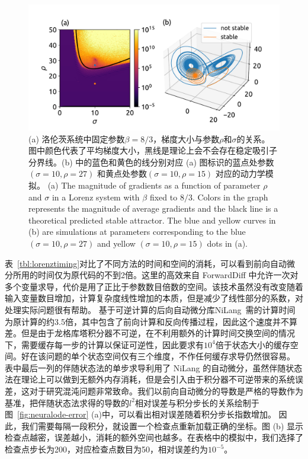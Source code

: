 \documentclass[A4,twoside,UTF8]{ctexart}
\begin{document}
\begin{figure}[t]
\centering
\includegraphics[width=0.8\columnwidth]{./fig4.pdf}
    \caption{(a) 洛伦茨系统中固定参数$\beta=8/3$，梯度大小与参数$\rho$和$\sigma$的关系。
    图中颜色代表了平均梯度大小，黑线是理论上会不会存在稳定吸引子分界线。(b) 中的蓝色和黄色的线分别对应 (a) 图标识的蓝点处参数 $(\sigma=10, \rho=27)$ 和黄点处参数$(\sigma=10, \rho=15)$ 对应的动力学模拟。
    (a) The magnitude of gradients as a function of parameter $\rho$ and $\sigma$ in a Lorenz system with  $\beta$ fixed to $8/3$.
    Colors in the graph represents the magnitude of average gradients and the black line is a theoretical predicted  stable attractor. The blue and yellow curves in (b) are simulations at parameters corresponding to the blue $(\sigma=10, \rho=27)$ and yellow $(\sigma=10, \rho=15)$ dots in (a).
    }\label{fig:chaos}
\end{figure}
表~\ref{tbl:lorenztiming}对比了不同方法的时间和空间的消耗，可以看到前向自动微分所用的时间仅为原代码的不到2倍。这里的高效来自 ForwardDiff 中允许一次对多个变量求导，代价是用了正比于参数数目倍数的空间。该技术虽然没有改变随着输入变量数目增加，计算复杂度线性增加的本质，但是减少了线性部分的系数，对处理实际问题很有帮助。
基于可逆计算的后向自动微分库NiLang~\cite{Liu2020b}需的计算时间为原计算的约3.5倍，其中包含了前向计算和反向传播过程，因此这个速度并不算差。但是由于龙格库塔积分器不可逆，在不利用额外的计算时间交换空间的情况下，需要缓存每一步的计算以保证可逆性，因此要求有$10^4$倍于状态大小的缓存空间。好在该问题的单个状态空间仅有三个维度，不作任何缓存求导仍然很容易。
表中最后一列的伴随状态法的单步求导利用了 NiLang 的自动微分，虽然伴随状态法在理论上可以做到无额外内存消耗，但是会引入由于积分器不可逆带来的系统误差，这对于研究混沌问题非常致命。我们以前向自动微分的导数是严格的导数作为基准，把伴随状态法求得的导数的$l^2$相对误差与积分步长的关系绘制于图~\ref{fig:neuralode-error} (a)中，可以看出相对误差随着积分步长指数增加。
因此，我们需要每隔一段积分，就设置一个检查点重新加载正确的坐标。图 (b) 显示检查点越密，误差越小，消耗的额外空间也越多。在表格中的模拟中，我们选择了检查点步长为200，对应检查点数目为50，相对误差约为$10^{-5}$。
\end{document}
